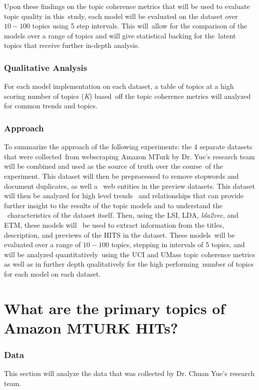 \documentclass[letterpaper,12pt]{article}
\begin{document}

Upon these findings on the topic coherence metrics that will be used to evaluate topic quality in this\
study, each model will be evaluated on the dataset over $10-100$ topics using 5 step intervals. This will\
allow for the comparison of the models over a range of topics and will give statistical backing for the\
latent topics that receive further in-depth analysis.

\subsection{Qualitative Analysis}
For each model implementation on each dataset, a table of topics at a high scoring number of topics (\emph{K}) based\
off the topic coherence metrics will analyzed for common trends and topics. 

\subsection{Approach}
To summarize the approach of the following experiments: the 4 separate datasets that were collected\
from webscraping Amazon MTurk by Dr. Yue's research team will be combined and used as the source of truth over the course\
of the experiment. This dataset will then be preprocessed to remove stopwords and document duplicates, as well a \
web entities in the preview datasets. This dataset will then be analyzed for high level trends \
and relationships that can provide further insight to the results of the topic models and to understand the \
characteristics of the dataset itself. Then, using the LSI, LDA, \emph{lda2vec}, and ETM, these models will \
be used to extract information from the titles, description, and previews of the HITS in the dataset. These models\
will be evaluated over a range of $10-100$ topics, stepping in intervals of 5 topics, and will be analyzed quantitatively\
using the UCI and UMass topic coherence metrics as well as in further depth qualitatively for the high performing\
number of topics for each model on each dataset. 

\chapter{What are the primary topics of Amazon MTURK HITs?}

\subsection{Data}
This section will analyze the data that was collected by Dr. Chuan Yue's research team.
\end{document}
